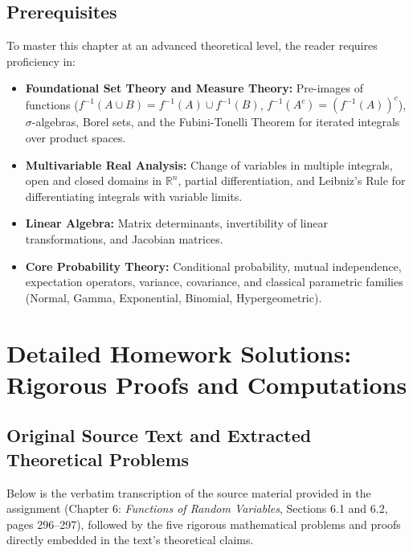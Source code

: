 \documentclass[11pt, letterpaper]{article}
\theoremstyle{definition}
\theoremstyle{remark}
\newcommand{\R}{\mathbb{R}}
\begin{document}
\subsection{Prerequisites}

To master this chapter at an advanced theoretical level, the reader requires proficiency in:
\begin{itemize}
    \item \textbf{Foundational Set Theory and Measure Theory:} Pre-images of functions ($f^{-1}(A \cup B) = f^{-1}(A) \cup f^{-1}(B)$, $f^{-1}(A^c) = (f^{-1}(A))^c$), $\sigma$-algebras, Borel sets, and the Fubini-Tonelli Theorem for iterated integrals over product spaces.
    \item \textbf{Multivariable Real Analysis:} Change of variables in multiple integrals, open and closed domains in $\R^n$, partial differentiation, and Leibniz's Rule for differentiating integrals with variable limits.
    \item \textbf{Linear Algebra:} Matrix determinants, invertibility of linear transformations, and Jacobian matrices.
    \item \textbf{Core Probability Theory:} Conditional probability, mutual independence, expectation operators, variance, covariance, and classical parametric families (Normal, Gamma, Exponential, Binomial, Hypergeometric).
\end{itemize}

\newpage

\section{Detailed Homework Solutions: Rigorous Proofs and Computations}

\subsection{Original Source Text and Extracted Theoretical Problems}

Below is the verbatim transcription of the source material provided in the assignment (Chapter 6: \emph{Functions of Random Variables}, Sections 6.1 and 6.2, pages 296--297), followed by the five rigorous mathematical problems and proofs directly embedded in the text's theoretical claims.
\end{document}
